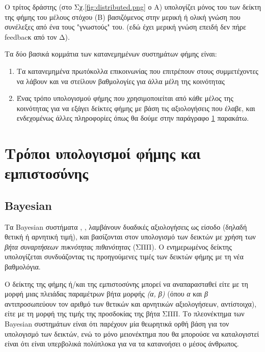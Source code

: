 
Ο τρίτος δράστης (στο Σχ.\ref{fig:distributed.png}  ο Α) υπολογίζει μόνος του των δείκτη της φήμης του μέλους στόχου (Β) βασιζόμενος στην μερική ή ολική γνώση που συνέλεξες από ένα τους "γνωστούς" του. (εδώ έχει μερική γνώση επειδή δεν πήρε feedbacκ από τον Δ).

Τα δύο βασικά κομμάτια των κατανεμημένων συστημάτων φήμης είναι:
\begin{enumerate}

\item Τα κατανεμημένα πρωτόκολλα επικοινωνίας που επιτρέπουν στους συμμετέχοντες να λάβουν και να στείλουν βαθμολογίες για άλλα μέλη της κοινότητας

\item Ένας τρόπο υπολογισμού φήμης που χρησιμοποιείται από κάθε μέλος της κοινότητας για να εξάγει δείκτες φήμης με βάση τις αξιολογήσεις που έλαβε, και ενδεχομένως άλλες πληροφορίες όπως θα δούμε στην παράγραφο \ref{sec:compute} παρακάτω.

\end{enumerate}
\newpage
\section{Τρόποι υπολογισμοί φήμης και εμπιστοσύνης}\label{sec:compute}

\subsection{Bayesian}

Τα Bayesian συστήματα \cite{Josang02}, \cite{Mui},  \cite{Whitby} 
 λαμβάνουν δυαδικές αξιολογήσεις ως είσοδο (δηλαδή θετική ή αρνητική τιμή), και βασίζονται στον υπολογισμό των δεικτών  με χρήση των \textit{βήτα συναρτήσεων πυκνότητας πιθανότητας} (ΣΠΠ). Ο  ενημερωμένος δείκτης υπολογίζεται συνδυάζοντας τις προηγούμενες τιμές των δεικτών φήμης με τη νέα βαθμολόγια.

 Ο δείκτης της φήμης ή/και της εμπιστοσύνης μπορεί να αναπαρασταθεί είτε με τη μορφή μιας πλειάδας παραμέτρων βήτα μορφής \textit{(α, β)} (όπου \textit{α} και \textit{β} αντιπροσωπεύουν τον αριθμό των θετικών και αρνητικών αξιολογήσεων, αντίστοιχα), είτε με τη μορφή της τιμής της προσδοκίας της βήτα ΣΠΠ. Το πλεονέκτημα των Bayesian συστημάτων είναι ότι παρέχουν μία θεωρητικά ορθή βάση για τον υπολογισμό των δεικτών, ενώ το μόνο μειονέκτημα που θα μπορούσε να καταλογιστεί είναι ότι είναι υπερβολικά πολύπλοκα για να τα κατανοήσει ο μέσος άνθρωπος.

